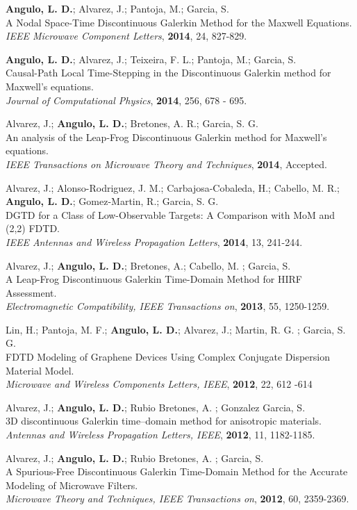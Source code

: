 \documentclass[a4paper,margin,line]{res}
\begin{document}
\begin{resume}
{\bf Angulo, L. D.}; Alvarez, J.; Pantoja, M.; Garcia, S.\\
A Nodal Space-Time Discontinuous Galerkin Method for the Maxwell Equations.\\
{\it IEEE Microwave Component Letters}, {\bf 2014}, 24, 827-829.

{\bf Angulo, L. D.}; Alvarez, J.; Teixeira, F. L.; Pantoja, M.; Garcia, S.\\
Causal-Path Local Time-Stepping in the Discontinuous Galerkin method for Maxwell's equations.\\
{\it Journal of Computational Physics}, {\bf 2014}, 256, 678 - 695.

Alvarez, J.; {\bf Angulo, L. D.}; Bretones, A. R.; Garcia, S. G.\\
An analysis of the Leap-Frog Discontinuous Galerkin method for Maxwell’s equations.\\
{\it IEEE Transactions on Microwave Theory and Techniques}, {\bf 2014}, Accepted.

Alvarez, J.; Alonso-Rodriguez, J. M.; Carbajosa-Cobaleda, H.; Cabello, M. R.; {\bf Angulo, L. D.}; Gomez-Martin, R.; Garcia, S. G.\\
DGTD for a Class of Low-Observable Targets: A Comparison with MoM and (2,2) FDTD.\\
{\it IEEE Antennas and Wireless Propagation Letters}, {\bf 2014}, 13, 241-244.

Alvarez, J.; {\bf Angulo, L. D.}; Bretones, A.; Cabello, M. ; Garcia, S.\\
A Leap-Frog Discontinuous Galerkin Time-Domain Method for HIRF Assessment.\\
{\it Electromagnetic Compatibility, IEEE Transactions on}, {\bf 2013}, 55, 1250-1259.

Lin, H.; Pantoja, M. F.; {\bf Angulo, L. D.}; Alvarez, J.; Martin, R. G. ; Garcia, S. G.\\
FDTD Modeling of Graphene Devices Using Complex Conjugate Dispersion Material Model.\\
{\it Microwave and Wireless Components Letters, IEEE}, {\bf 2012}, 22, 612 -614

Alvarez, J.; {\bf Angulo, L. D.}; Rubio Bretones, A. ; Gonzalez Garcia, S.\\
3D discontinuous Galerkin time--domain method for anisotropic materials.\\
{\it Antennas and Wireless Propagation Letters, IEEE}, {\bf 2012}, 11, 1182-1185.

Alvarez, J.; {\bf Angulo, L. D.}; Rubio Bretones, A. ; Garcia, S.\\
A Spurious-Free Discontinuous Galerkin Time-Domain Method for the Accurate Modeling of Microwave Filters.\\
{\it Microwave Theory and Techniques, IEEE Transactions on}, {\bf 2012}, 60, 2359-2369.


\end{resume}
\end{document}
